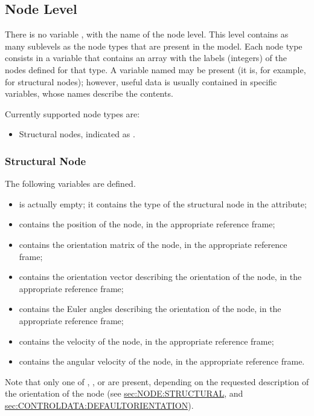 \subsection{Node Level}
There is no variable , with the name of the node level.
This level contains as many sublevels as the node types
that are present in the model.
Each node type consists in a variable that contains an array
with the labels (integers) of the nodes defined for that type.
A variable named  may be present (it is,
for example, for structural nodes); however, useful data is usually
contained in specific variables, whose names describe the contents.

Currently supported node types are:
\begin{itemize}
\item Structural nodes, indicated as .
\end{itemize}



\subsubsection{Structural Node}
\label{sec:NetCDF:Node:Structural Node}
The following variables are defined.
\begin{itemize}
\item {} is actually empty;
it contains the type of the structural node in the  attribute;

\item {} contains the position of the node,
in the appropriate reference frame;

\item {} contains the orientation matrix of the node,
in the appropriate reference frame;

\item {} contains the orientation vector
describing the orientation of the node, in the appropriate reference frame;

\item {} contains the Euler angles
describing the orientation of the node, in the appropriate reference frame;

\item {} contains the velocity
of the node, in the appropriate reference frame;

\item {} contains the angular velocity
of the node, in the appropriate reference frame.
\end{itemize}
Note that only one of , , or  are present,
depending on the requested description of the orientation of the node
(see
\hyperref{\kw{structural node}}{\kw{structural node}, Section~}{}{sec:NODE:STRUCTURAL},
and
\hyperref{\kw{default orientation}}{\kw{default orientation}, Section~}{}{sec:CONTROLDATA:DEFAULTORIENTATION}).

